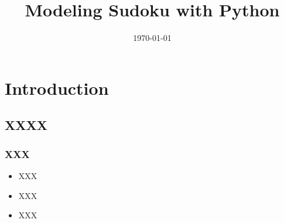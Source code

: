 \documentclass[draft,12pt,letterpaper]{beamer}
\title{Modeling Sudoku with Python}
\author{\Us}
\date{\today}
\begin{document}
\frame{\titlepage}

\section[Outline]{}
\frame{\tableofcontents}

\section{Introduction}
\subsection{XXXX}
\frame
{
  \frametitle{XXX}

  \begin{itemize}
  \item<1-> XXX
  \item<2-> XXX
  \item<3-> XXX      
  \end{itemize}
}
\end{document}
